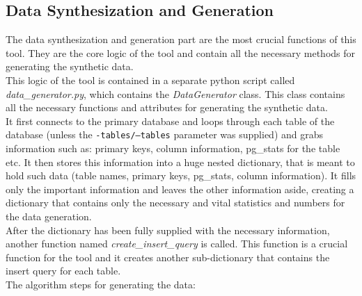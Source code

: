 \subsection{Data Synthesization and Generation}
The data synthesization and generation part are the most crucial functions of this tool. They are the core logic of the tool and contain all the necessary methods for generating the synthetic data.\\
\newline
This logic of the tool is contained in a separate python script called \textit{data\_generator.py}, which contains the \textit{DataGenerator} class. This class contains all the necessary functions and attributes for generating the synthetic data.\\
It first connects to the primary database and loops through each table of the database (unless the \texttt{-tables/--tables} parameter was supplied) and grabs information such as: primary keys, column information, pg\_stats for the table etc. It then stores this information into a huge nested dictionary, that is meant to hold such data (table names, primary keys, pg\_stats, column information). It fills only the important information and leaves the other information aside, creating a dictionary that contains only the necessary and vital statistics and numbers for the data generation.\\
\newline
After the dictionary has been fully supplied with the necessary information, another function named \textit{create\_insert\_query} is called. This function is a crucial function for the tool and it creates another sub-dictionary that contains the insert query for each table.\\
\newline
The algorithm steps for generating the data:
